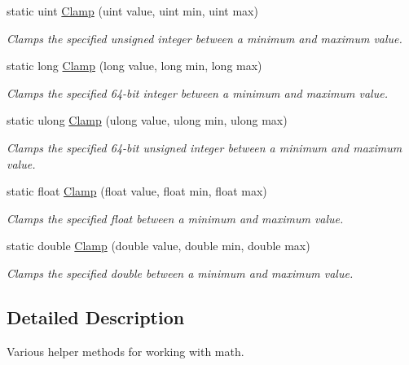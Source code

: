 \begin{DoxyCompactItemize}
static uint \hyperlink{class_tri_devs_1_1_tri_engine2_d_1_1_helpers_1_1_math_ac47eb16092e993da716e3187e94e70fe}{Clamp} (uint value, uint min, uint max)
\begin{DoxyCompactList}\small\item\em Clamps the specified unsigned integer between a minimum and maximum value. \end{DoxyCompactList}\item 
static long \hyperlink{class_tri_devs_1_1_tri_engine2_d_1_1_helpers_1_1_math_a8bf4a27be5be0d5019f4c4c4630dea12}{Clamp} (long value, long min, long max)
\begin{DoxyCompactList}\small\item\em Clamps the specified 64-\/bit integer between a minimum and maximum value. \end{DoxyCompactList}\item 
static ulong \hyperlink{class_tri_devs_1_1_tri_engine2_d_1_1_helpers_1_1_math_a36137a079842e61c479e49912dd7c825}{Clamp} (ulong value, ulong min, ulong max)
\begin{DoxyCompactList}\small\item\em Clamps the specified 64-\/bit unsigned integer between a minimum and maximum value. \end{DoxyCompactList}\item 
static float \hyperlink{class_tri_devs_1_1_tri_engine2_d_1_1_helpers_1_1_math_ab7bef68051503cf981d8d40a42995bd7}{Clamp} (float value, float min, float max)
\begin{DoxyCompactList}\small\item\em Clamps the specified float between a minimum and maximum value. \end{DoxyCompactList}\item 
static double \hyperlink{class_tri_devs_1_1_tri_engine2_d_1_1_helpers_1_1_math_a1ca86361f1c492c65f901a98b86fd710}{Clamp} (double value, double min, double max)
\begin{DoxyCompactList}\small\item\em Clamps the specified double between a minimum and maximum value. \end{DoxyCompactList}\end{DoxyCompactItemize}


\subsection{Detailed Description}
Various helper methods for working with math. 



